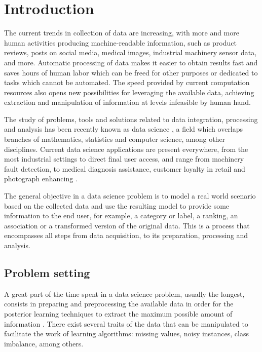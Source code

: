 \setchapterpreamble[u]{\margintoc}
\chapter{Introduction}


The current trends in collection of data are increasing, with more and more human activities producing machine-readable information, such as product reviews, posts on social media, medical images, industrial machinery sensor data,  and more. Automatic processing of data makes it easier to obtain  results fast and saves hours of human labor which can be freed for other purposes or dedicated to tasks which cannot be automated. The speed provided by current computation resources also opens new possibilities for leveraging the available data, achieving extraction and manipulation of information at levels infeasible by human hand.

The study of problems, tools and solutions related to data integration, processing and analysis has been recently known as data science , a field which overlaps branches of mathematics, statistics and computer science, among other disciplines. Current data science applications are present everywhere, from the most industrial settings to direct final user access, and range from machinery fault detection, to medical diagnosis assistance, customer loyalty in retail and photograph enhancing .

The general objective in a data science problem is to model a real world scenario based on the collected data and use the resulting model to provide some information to the end user, for example, a category or label, a ranking, an association or a transformed version of the original data. This is a process that encompasses all steps from data acquisition, to its preparation, processing and analysis.

\section{Problem setting}

A great part of the time spent in a data science problem, usually the longest, consists in preparing and preprocessing the available data in order for the posterior learning techniques to extract the maximum possible amount of information . There exist several traits of the data that can be manipulated to facilitate the work of learning algorithms: missing values, noisy instances, class imbalance, among others.

